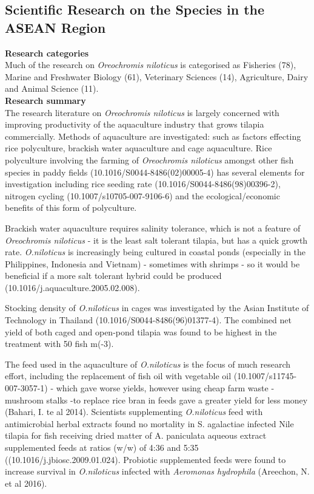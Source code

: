 \documentclass[]{book}
\theoremstyle{definition}
\theoremstyle{definition}
\theoremstyle{definition}
\theoremstyle{remark}
\begin{document}
\hypertarget{scientific-research-on-the-species-in-the-asean-region-3}{%
\subsection{Scientific Research on the Species in the ASEAN
Region}\label{scientific-research-on-the-species-in-the-asean-region-3}}

\textbf{Research categories}\\
Much of the research on \emph{Oreochromis niloticus} is categorised as
Fisheries (78), Marine and Freshwater Biology (61), Veterinary Sciences
(14), Agriculture, Dairy and Animal Science (11).\\
\textbf{Research summary}\\
The research literature on \emph{Oreochromis niloticus} is largely
concerned with improving productivity of the aquaculture industry that
grows tilapia commercially. Methods of aquaculture are investigated:
such as factors effecting rice polyculture, brackish water aquaculture
and cage aquaculture. Rice polyculture involving the farming of
\emph{Oreochromis niloticus} amongst other fish species in paddy fields
(10.1016/S0044-8486(02)00005-4) has several elements for investigation
including rice seeding rate (10.1016/S0044-8486(98)00396-2), nitrogen
cycling (10.1007/s10705-007-9106-6) and the ecological/economic benefits
of this form of polyculture.

Brackish water aquaculture requires salinity tolerance, which is not a
feature of \emph{Oreochromis niloticus} - it is the least salt tolerant
tilapia, but has a quick growth rate. \emph{O.niloticus} is increasingly
being cultured in coastal ponds (especially in the Philippines,
Indonesia and Vietnam) - sometimes with shrimps - so it would be
beneficial if a more salt tolerant hybrid could be produced
(10.1016/j.aquaculture.2005.02.008).

Stocking density of \emph{O.niloticus} in cages was investigated by the
Asian Institute of Technology in Thailand
(10.1016/S0044-8486(96)01377-4). The combined net yield of both caged
and open-pond tilapia was found to be highest in the treatment with 50
fish m(-3).

The feed used in the aquaculture of \emph{O.niloticus} is the focus of
much research effort, including the replacement of fish oil with
vegetable oil (10.1007/s11745-007-3057-1) - which gave worse yields,
however using cheap farm waste -mushroom stalks -to replace rice bran in
feeds gave a greater yield for less money (Bahari, I. te al 2014).
Scientists supplementing \emph{O.niloticus} feed with antimicrobial
herbal extracts found no mortality in S. agalactiae infected Nile
tilapia for fish receiving dried matter of A. paniculata aqueous extract
supplemented feeds at ratios (w/w) of 4:36 and 5:35
((10.1016/j.jbiosc.2009.01.024). Probiotic supplemented feeds were found
to increase survival in \emph{O.niloticus} infected with \emph{Aeromonas
hydrophila} (Areechon, N. et al 2016).
\end{document}
